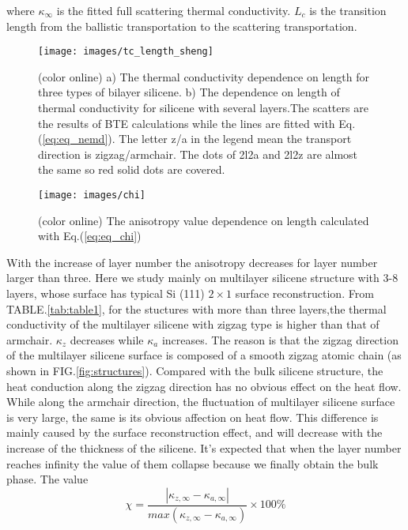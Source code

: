 \documentclass[%
 reprint,
 amsmath,amssymb,
 aps,
 prb,
]{revtex4-1}
\begin{document}
where $\kappa_\infty$ is the fitted full scattering thermal conductivity. $L_c$ is the transition length from the ballistic transportation to the scattering transportation.

\begin{figure}[b]
  \texttt{[image: images/tc\_length\_sheng]}
  \caption{\label{fig:tc_length_sheng} (color online) a) The thermal conductivity dependence on length for three types of bilayer silicene. b) The dependence on length of thermal conductivity for silicene with several layers.The scatters are the results of BTE calculations while the lines are fitted with Eq.(\ref{eq:eq_nemd}). The letter z/a in the legend mean the transport direction is zigzag/armchair. The dots of 2l2a and 2l2z are almost the same so red solid dots are covered. }
\end{figure}

\begin{figure}[b]
  \texttt{[image: images/chi]}{}
  \caption{\label{fig:chi} (color online) The anisotropy value dependence on length calculated with Eq.(\ref{eq:eq_chi})}
\end{figure}


With the increase of layer number the anisotropy decreases for layer number larger than three. Here we study mainly on multilayer silicene structure with 3-8 layers, whose  surface has typical Si (111) $2 \times 1$ surface reconstruction.   From TABLE.\ref{tab:table1}, for the stuctures with more than three layers,the thermal conductivity of the multilayer silicene with zigzag type is higher than that of armchair. $\kappa_z$ decreases while $\kappa_a$ increases. The reason is that the zigzag direction of the multilayer silicene surface is composed of a smooth zigzag atomic chain (as shown in FIG.\ref{fig:structures}). Compared with the bulk silicene structure, the heat conduction along the zigzag direction has no obvious effect on the heat flow. While along the armchair direction, the fluctuation of multilayer silicene surface is very large, the same is its obvious affection on heat flow. This difference is mainly caused by the surface reconstruction effect, and will decrease with the increase of the thickness of the silicene. It's expected that when the layer number reaches infinity the value of them collapse because we finally obtain the bulk phase. The value
\begin{equation}
  \chi=\frac{|\kappa_{z,\infty}-\kappa_{a,\infty} |}{ max⁡(\kappa_{z,\infty}-\kappa_{a,\infty} ) } \times 100 \%  \label{eq:eq_chi}
\end{equation}
\end{document}
